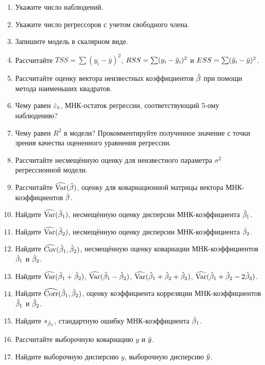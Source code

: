 \begin{problem}
\begin{enumerate}
\item Укажите число наблюдений.
\item Укажите число регрессоров с учетом свободного члена.
\item Запишите модель в скалярном виде.
\item Рассчитайте $TSS=\sum (y_i-\bar{y})^2$, $RSS=\sum (y_i-\hat{y}_i)^2$ и $ESS=\sum (\hat{y}_i-\bar{y})^2$.
\item Рассчитайте оценку вектора неизвестных коэффициентов $\hat{\beta}$ при помощи метода наименьших квадратов.
\item Чему равен $\hat{\varepsilon}_5$, МНК-остаток регрессии, соответствующий 5-ому наблюдению?
\item Чему равен $R^2$  в модели? Прокомментируйте полученное значение с точки зрения качества оцененного уравнения регрессии.
\item Рассчитайте несмещённую оценку для неизвестного параметра $\sigma^2$ регрессионной модели.
\item Рассчитайте $\widehat{\operatorname{Var}}(\hat{\beta})$, оценку для ковариационной матрицы вектора МНК-коэффициентов $\hat{\beta}$.
\item Найдите $\widehat{\operatorname{Var}}(\hat{\beta}_1)$, несмещённую оценку дисперсии МНК-коэффициента $\hat{\beta}_1$.
\item Найдите $\widehat{\operatorname{Var}}(\hat{\beta}_2)$, несмещённую оценку дисперсии МНК-коэффициента $\hat{\beta}_2$.
\item Найдите $\widehat{\operatorname{Cov}}(\hat{\beta}_1,\hat{\beta}_2)$, несмещённую оценку ковариации МНК-коэффициентов $\hat{\beta}_1$ и $\hat{\beta}_2$.
\item Найдите $\widehat{\operatorname{Var}}(\hat{\beta}_1+\hat{\beta}_2)$, $\widehat{\operatorname{Var}}(\hat{\beta}_1-\hat{\beta}_2)$, $\widehat{\operatorname{Var}}(\hat{\beta}_1+\hat{\beta}_2+\hat{\beta}_3)$, $\widehat{\operatorname{Var}}(\hat{\beta}_1+\hat{\beta}_2-2\hat{\beta}_3)$.
\item Найдите $\widehat{\operatorname{Corr}}(\hat{\beta}_1,\hat{\beta}_2)$, оценку коэффициента корреляции МНК-коэффициентов $\hat{\beta}_1$ и $\hat{\beta}_2$.
\item Найдите $s_{\hat{\beta}_1}$, стандартную ошибку МНК-коэффициента $\hat{\beta}_1$.
\item Рассчитайте выборочную ковариацию $y$ и $\hat{y}$.
\item Найдите выборочную дисперсию $y$, выборочную дисперсию $\hat{y}$.
\end{enumerate}

\begin{sol}


\end{sol}
\end{problem}
